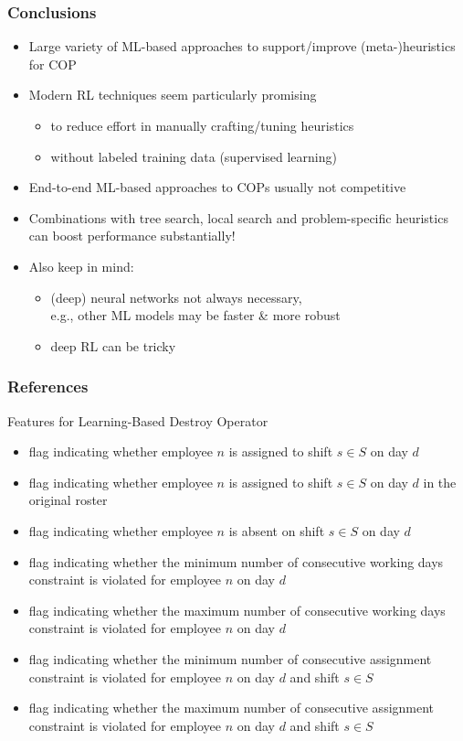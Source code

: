 \documentclass[aspectratio=1610]{beamer}
\renewcommand{\footnotesize}{\scriptsize}
\begin{document}
\begin{frame}
	\frametitle{Conclusions}
	\begin{itemize}
		\itemsep2.5ex
		\item Large variety of ML-based approaches to support/improve (meta-)heuristics for COP
		\item Modern RL techniques seem particularly promising
		\begin{itemize}
			\item to reduce effort in manually crafting/tuning heuristics
			\item without labeled training data (supervised learning)
		\end{itemize}
		\item End-to-end ML-based approaches to COPs usually not competitive
		\item Combinations with tree search, local search and problem-specific heuristics can boost performance substantially!
		\item Also keep in mind: 
		\begin{itemize}
			\item (deep) neural networks not always necessary,\\
			e.g., other ML models may be faster \& more robust
			\item deep RL can be tricky
		\end{itemize}
	
	\end{itemize}
\end{frame}


\begin{frame}[allowframebreaks]
	\frametitle{References}
	\footnotesize
	
	
\end{frame}


\begin{frame}{Features for Learning-Based Destroy Operator}
	\footnotesize
	\begin{itemize}
		\item flag indicating whether employee $n$ is assigned to shift $s \in S$ on day $d$  
		\item flag indicating whether employee $n$ is assigned to shift $s \in S$ on day $d$ in the original roster 
		\item flag indicating whether employee $n$ is absent on shift $s \in S$ on day $d$  
		\item flag indicating whether the minimum number of consecutive working days constraint is violated for employee $n$ on day $d$
		\item flag indicating whether the maximum number of consecutive working days constraint is violated for employee $n$ on day $d$  
		\item flag indicating whether the minimum number of consecutive assignment constraint is violated for employee $n$ on day $d$ and shift $s \in S$  
		\item flag indicating whether the maximum number of consecutive assignment constraint is violated for employee $n$ on day $d$ and shift $s \in S$  
	\end{itemize}
\end{frame}
\end{document}
